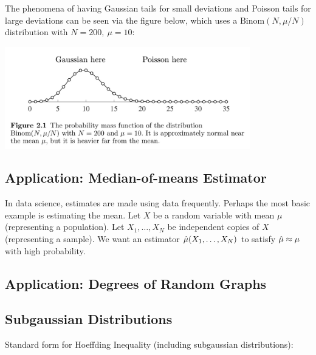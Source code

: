 \begin{remark}
The phenomena of having Gaussian tails for small deviations and Poisson tails for large deviations 
can be seen via the figure below, which uses a $\text{Binom}(N, \mu / N)$ distribution with 
$N = 200, \ \mu = 10$:
\begin{center}
	\includegraphics[width=0.8\textwidth]{Chapter 2/fig2-1.png}
\end{center}
\end{remark}


\subsection{Application: Median-of-means Estimator}
In data science, estimates are made using data frequently. Perhaps the most basic example is estimating 
the mean. Let $X$ be a random variable with mean $\mu$ (representing a population). Let $X_1, \dots, X_N$ 
be independent copies of $X$ (representing a sample). We want an estimator $\Hat{\mu}(X_1, \dots, X_N)$ 
to satisfy $\Hat{\mu} \approx \mu$ with high probability.


\subsection{Application: Degrees of Random Graphs}


\subsection{Subgaussian Distributions}
Standard form for Hoeffding Inequality (including subgaussian distributions): 
\[  \]
